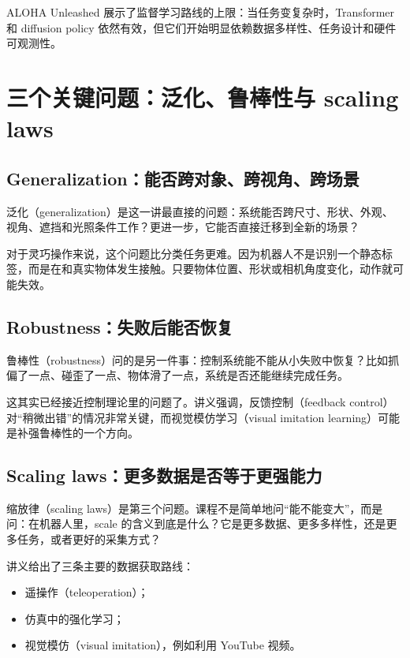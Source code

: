 \documentclass[a4paper]{article}
\begin{document}
ALOHA Unleashed 展示了监督学习路线的上限：当任务变复杂时，Transformer 和 diffusion policy 依然有效，但它们开始明显依赖数据多样性、任务设计和硬件可观测性。

\section{三个关键问题：泛化、鲁棒性与 scaling laws}

\subsection{Generalization：能否跨对象、跨视角、跨场景}

泛化（generalization）是这一讲最直接的问题：系统能否跨尺寸、形状、外观、视角、遮挡和光照条件工作？更进一步，它能否直接迁移到全新的场景？

对于灵巧操作来说，这个问题比分类任务更难。因为机器人不是识别一个静态标签，而是在和真实物体发生接触。只要物体位置、形状或相机角度变化，动作就可能失效。

\subsection{Robustness：失败后能否恢复}

鲁棒性（robustness）问的是另一件事：控制系统能不能从小失败中恢复？比如抓偏了一点、碰歪了一点、物体滑了一点，系统是否还能继续完成任务。

这其实已经接近控制理论里的问题了。讲义强调，反馈控制（feedback control）对“稍微出错”的情况非常关键，而视觉模仿学习（visual imitation learning）可能是补强鲁棒性的一个方向。

\subsection{Scaling laws：更多数据是否等于更强能力}

缩放律（scaling laws）是第三个问题。课程不是简单地问“能不能变大”，而是问：在机器人里，scale 的含义到底是什么？它是更多数据、更多多样性，还是更多任务，或者更好的采集方式？

讲义给出了三条主要的数据获取路线：
\begin{itemize}
  \item 遥操作（teleoperation）；
  \item 仿真中的强化学习；
  \item 视觉模仿（visual imitation），例如利用 YouTube 视频。
\end{itemize}
\end{document}

